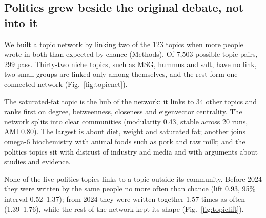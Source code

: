 

\subsection*{Politics grew beside the original debate, not into it}
We built a topic network by linking two of the 123 topics when more people wrote in both than expected by chance (Methods). Of 7{,}503 possible topic pairs, 299 pass. Thirty-two niche topics, such as MSG, hummus and salt, have no link, two small groups are linked only among themselves, and the rest form one connected network (Fig.~\ref{fig:topicnet}).

The saturated-fat topic is the hub of the network: it links to 34 other topics and ranks first on degree, betweenness, closeness and eigenvector centrality. The network splits into clear communities (modularity 0.43, stable across 20 runs, AMI 0.80). The largest is about diet, weight and saturated fat; another joins omega-6 biochemistry with animal foods such as pork and raw milk; and the politics topics sit with distrust of industry and media and with arguments about studies and evidence.

None of the five politics topics links to a topic outside its community. Before 2024 they were written by the same people no more often than chance (lift 0.93, 95\% interval 0.52--1.37); from 2024 they were written together 1.57 times as often (1.39--1.76), while the rest of the network kept its shape (Fig.~\ref{fig:topiclift}).

